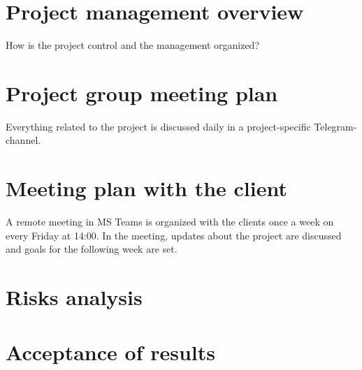 \section{Project management overview}

How is the project control and the management organized?


\section{Project group meeting plan}

Everything related to the project is discussed daily in a project-specific Telegram-channel.


\section{Meeting plan with the client}

A remote meeting in MS Teams is organized with the clients once a week on every Friday at 14:00. In the meeting,
updates about the project are discussed and goals for the following week are set.


\section{Risks analysis}


\section{Acceptance of results}

